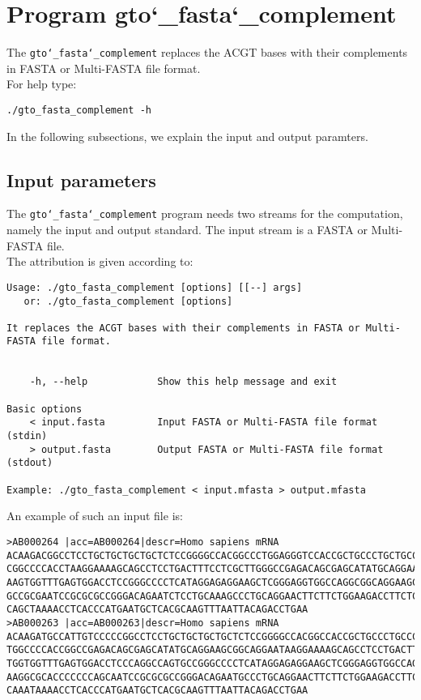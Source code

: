 \section{Program gto\char`_fasta\char`_complement}
The \texttt{gto\char`_fasta\char`_complement} replaces the ACGT bases with their complements in FASTA or Multi-FASTA file format.\\
For help type:
\begin{lstlisting}
./gto_fasta_complement -h
\end{lstlisting}
In the following subsections, we explain the input and output paramters.

\subsection*{Input parameters}

The \texttt{gto\char`_fasta\char`_complement} program needs two streams for the computation, namely the input and output standard. The input stream is a FASTA or Multi-FASTA file.\\
The attribution is given according to:
\begin{lstlisting}
Usage: ./gto_fasta_complement [options] [[--] args]
   or: ./gto_fasta_complement [options]

It replaces the ACGT bases with their complements in FASTA or Multi-FASTA file format.


    -h, --help            Show this help message and exit

Basic options
    < input.fasta         Input FASTA or Multi-FASTA file format (stdin)
    > output.fasta        Output FASTA or Multi-FASTA file format (stdout)

Example: ./gto_fasta_complement < input.mfasta > output.mfasta
\end{lstlisting}
An example of such an input file is:
\begin{lstlisting}
>AB000264 |acc=AB000264|descr=Homo sapiens mRNA 
ACAAGACGGCCTCCTGCTGCTGCTGCTCTCCGGGGCCACGGCCCTGGAGGGTCCACCGCTGCCCTGCTGCCATTGTCCC
CGGCCCCACCTAAGGAAAAGCAGCCTCCTGACTTTCCTCGCTTGGGCCGAGACAGCGAGCATATGCAGGAAGCGGCAGG
AAGTGGTTTGAGTGGACCTCCGGGCCCCTCATAGGAGAGGAAGCTCGGGAGGTGGCCAGGCGGCAGGAAGCAGGCCAGT
GCCGCGAATCCGCGCGCCGGGACAGAATCTCCTGCAAAGCCCTGCAGGAACTTCTTCTGGAAGACCTTCTCCACCCCCC
CAGCTAAAACCTCACCCATGAATGCTCACGCAAGTTTAATTACAGACCTGAA
>AB000263 |acc=AB000263|descr=Homo sapiens mRNA 
ACAAGATGCCATTGTCCCCCGGCCTCCTGCTGCTGCTGCTCTCCGGGGCCACGGCCACCGCTGCCCTGCCCCTGGAGGG
TGGCCCCACCGGCCGAGACAGCGAGCATATGCAGGAAGCGGCAGGAATAAGGAAAAGCAGCCTCCTGACTTTCCTCGCT
TGGTGGTTTGAGTGGACCTCCCAGGCCAGTGCCGGGCCCCTCATAGGAGAGGAAGCTCGGGAGGTGGCCAGGCGGCAGG
AAGGCGCACCCCCCCAGCAATCCGCGCGCCGGGACAGAATGCCCTGCAGGAACTTCTTCTGGAAGACCTTCTCCTCCTG
CAAATAAAACCTCACCCATGAATGCTCACGCAAGTTTAATTACAGACCTGAA
\end{lstlisting}

